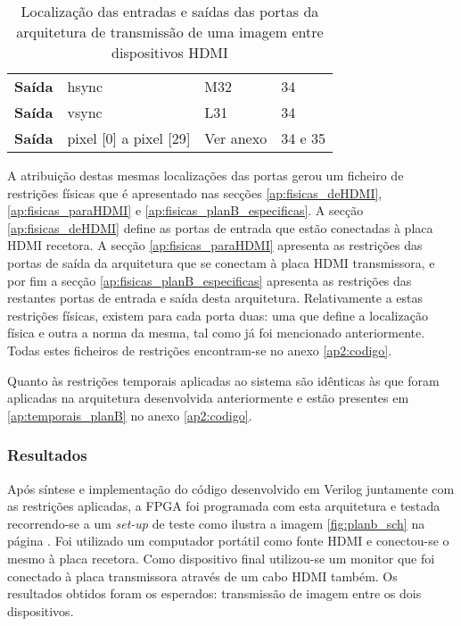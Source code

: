\begin{table}[h!]
\begin{tabular}{rlll}
			\multicolumn{1}{r|}{\textbf{Saída}}   & hsync                                 & M32                                      & 34                                         \\
			\multicolumn{1}{r|}{\textbf{Saída}}   & vsync                                 & L31                                      & 34                                         \\
			\multicolumn{1}{r|}{\textbf{Saída}}   & pixel {[}0{]} a pixel {[}29{]}        & Ver anexo                                & 34 e 35                                    \\ \hline
		\end{tabular}%
	\captionsetup{width=0.80\linewidth}
	\caption{Localização das entradas e saídas das portas da arquitetura de transmissão de uma imagem entre dispositivos HDMI}
	\label{table:LOCplanB_simples}
\end{table}



A atribuição destas mesmas localizações das portas gerou um ficheiro de restrições físicas que é apresentado nas secções \ref{ap:fisicas_deHDMI}, \ref{ap:fisicas_paraHDMI} e \ref{ap:fisicas_planB_especificas}. A secção \ref{ap:fisicas_deHDMI} define as portas de entrada que estão conectadas à placa HDMI recetora. A secção \ref{ap:fisicas_paraHDMI} apresenta as restrições das portas de saída da arquitetura que se conectam à placa HDMI transmissora, e por fim a secção \ref{ap:fisicas_planB_especificas} apresenta as restrições das restantes portas de entrada e saída desta arquitetura. Relativamente a estas restrições físicas, existem para cada porta duas: uma que define a localização física e outra a norma da mesma, tal como já foi mencionado anteriormente. Todas estes ficheiros de restrições encontram-se no anexo \ref{ap2:codigo}.

Quanto às restrições temporais aplicadas ao sistema são idênticas às que foram aplicadas na arquitetura desenvolvida anteriormente e estão presentes em \ref{ap:temporais_planB} no anexo \ref{ap2:codigo}.

\subsubsection*{Resultados}

Após síntese e implementação do código desenvolvido em Verilog juntamente com as restrições aplicadas, a FPGA foi programada com esta arquitetura e testada recorrendo-se a um \textit{set-up} de teste como ilustra a imagem \ref{fig:planb_sch} na página \pageref{fig:planb_sch}. Foi utilizado um computador portátil como fonte HDMI e conectou-se o mesmo à placa recetora. Como dispositivo final utilizou-se um monitor que foi conectado à placa transmissora através de um cabo HDMI também. Os resultados obtidos foram os esperados: transmissão de imagem entre os dois dispositivos.

